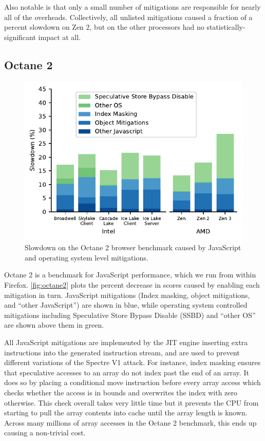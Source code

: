 Also notable is that only a small number of mitigations are responsible for nearly all of the overheads.
Collectively, all unlisted mitigations caused a fraction of a percent slowdown on Zen 2, but on the other processors had no statistically-significant impact at all.

\subsection{Octane 2}
\label{sec:benchmarks:octane-2}

\begin{figure}[t]
    \includegraphics[width=\columnwidth]{plots/octane2.pdf}
    \caption{Slowdown on the Octane 2 browser benchmark caused by JavaScript and operating system level mitigations.}
    \label{fig:octane2}
\end{figure}

Octane 2 is a benchmark for JavaScript performance, which we run from within Firefox.
\autoref{fig:octane2} plots the percent decrease in scores caused by enabling each mitigation in turn.
JavaScript mitigations (Index masking, object mitigations, and ``other JavaScript'') are shown in blue, while operating system controlled mitigations including Speculative Store Bypass Disable (SSBD) and ``other OS'' are shown above them in green.

All JavaScript mitigations are implemented by the JIT engine inserting extra instructions into the generated instruction stream, and are used to prevent different variations of the Spectre V1 attack.
For instance, index masking ensures that speculative accesses to an array do not index past the end of an array.
It does so by placing a conditional move instruction before every array access which checks whether the access is in bounds and overwrites the index with zero otherwise.
This check overall takes very little time but it prevents the CPU from starting to pull the array contents into cache until the array length is known.
Across many millions of array accesses in the Octane 2 benchmark, this ends up causing a non-trivial cost.

